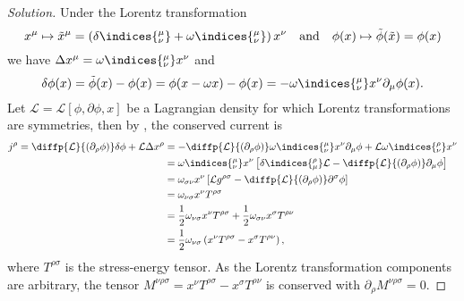 \begin{proof}[Solution]
    Under the Lorentz transformation
    \begin{equation*}
       x^\mu \mapsto \tilde{x}^\mu = \left(\delta\indices{^\mu_\nu} + \omega\indices{^\mu_\nu}\right)x^\nu
       \quad\text{and}\quad
       \phi(x) \mapsto \tilde{\phi}(\tilde{x}) = \phi(x)
    \end{equation*}
    we have \(\Delta x^\mu = \omega\indices{^\mu_\nu} x^\nu\) and
    \begin{equation*}
       \delta \phi(x) = \tilde{\phi}(x) - \phi(x) = \phi(x - \omega x) - \phi(x) = - \omega\indices{^\mu_\nu} x^\nu \partial_\mu \phi(x).
    \end{equation*}
    Let \(\mathcal{L} = \mathcal{L}[\phi, \partial \phi, x]\) be a Lagrangian density for which Lorentz transformations are symmetries, then by , the conserved current is
    \begin{align*}
       j^\rho 
       = \diffp{\mathcal{L}}{(\partial_\rho \phi)} \delta \phi + \mathcal{L} \Delta x^\rho
       &= -\diffp{\mathcal{L}}{(\partial_\rho \phi)} \omega\indices{^\mu_\nu} x^\nu \partial_\mu \phi + \mathcal{L} \omega\indices{^\rho_\nu}x^\nu\\
       &= \omega\indices{^\mu_\nu}x^\nu \left[\delta\indices{^\rho_\mu}\mathcal{L} - \diffp{\mathcal{L}}{(\partial_\rho \phi)} \partial_\mu \phi\right]\\
       &= \omega_{\sigma \nu} x^\nu \left[\mathcal{L} g^{\rho \sigma} - \diffp{\mathcal{L}}{(\partial_\rho\phi)} \partial^\sigma \phi\right]\\
       &= \omega_{\nu\sigma} x^\nu T^{\rho \sigma}\\
       &= \frac12 \omega_{\nu \sigma} x^\nu T^{\rho \sigma} + \frac12 \omega_{\sigma \nu} x^\sigma T^{\rho \nu}\\
       &= \frac12 \omega_{\nu \sigma} \left(x^\nu T^{\rho \sigma} - x^\sigma T^{\rho \nu}\right),
    \end{align*}
    where \(T^{\rho \sigma}\) is the stress-energy tensor. As the Lorentz transformation components are arbitrary, the tensor \(M^{\nu \rho \sigma} = x^\nu T^{\rho \sigma} - x^\sigma T^{\rho \nu}\) is conserved with \(\partial_\rho M^{\nu \rho \sigma} = 0\).
\end{proof}
